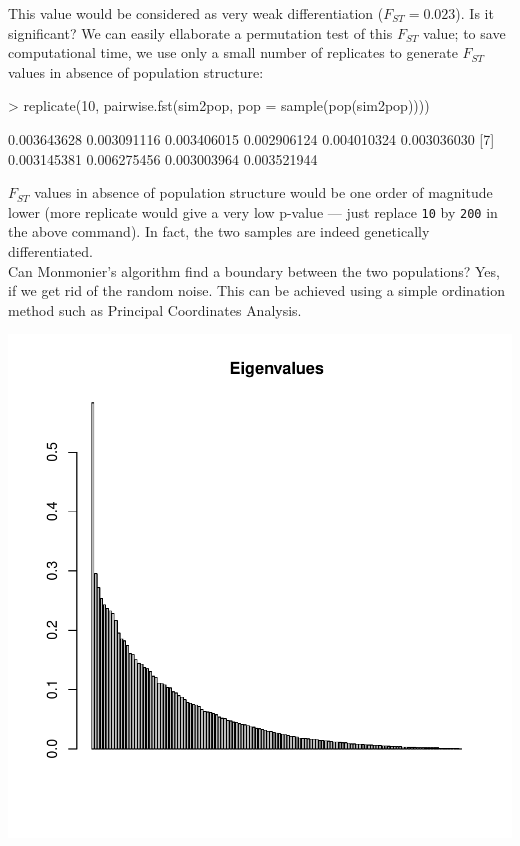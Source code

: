 \documentclass{article}
\begin{document}
\noindent This value would be considered as very weak differentiation ($F_{ST}=0.023$).
Is it significant?
We can easily ellaborate a permutation test of this $F_{ST}$ value; to save computational time, we
use only a small number of replicates to generate $F_{ST}$ values in absence of population structure:
\begin{Schunk}
\begin{Sinput}
> replicate(10, pairwise.fst(sim2pop, pop = sample(pop(sim2pop))))
\end{Sinput}
\begin{Soutput}
 [1] 0.003643628 0.003091116 0.003406015 0.002906124 0.004010324 0.003036030
 [7] 0.003145381 0.006275456 0.003003964 0.003521944
\end{Soutput}
\end{Schunk}
$F_{ST}$ values in absence of population structure would be one order of magnitude lower (more
replicate would give a very low p-value --- just replace \texttt{10} by \texttt{200} in the above command).
In fact, the two samples are indeed genetically differentiated.
\\

Can Monmonier's algorithm find a boundary between the two populations?
Yes, if we get rid of the random noise.
This can be achieved using a simple ordination method such as Principal Coordinates Analysis.

\begin{Schunk}
\end{Schunk}
\includegraphics{figs/base-mon6}
\end{document}
